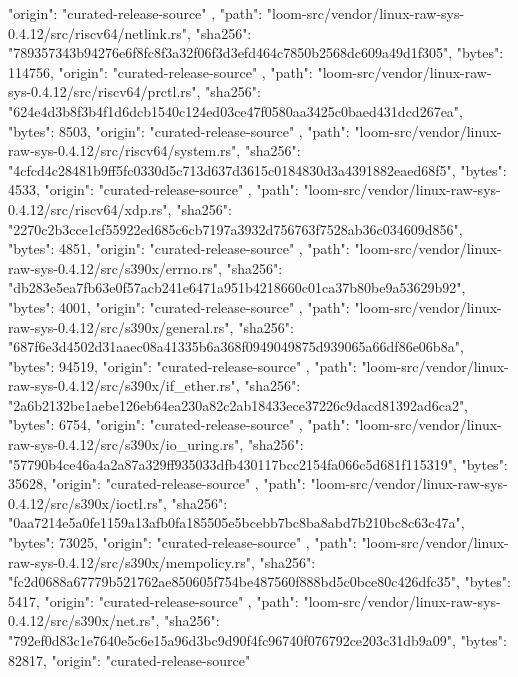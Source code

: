 {{      "origin": "curated-release-source"
    },
    {
      "path": "loom-src/vendor/linux-raw-sys-0.4.12/src/riscv64/netlink.rs",
      "sha256": "789357343b94276e6f8fc8f3a32f06f3d3efd464c7850b2568dc609a49d1f305",
      "bytes": 114756,
      "origin": "curated-release-source"
    },
    {
      "path": "loom-src/vendor/linux-raw-sys-0.4.12/src/riscv64/prctl.rs",
      "sha256": "624e4d3b8f3b4f1d6dcb1540c124ed03ce47f0580aa3425c0baed431dcd267ea",
      "bytes": 8503,
      "origin": "curated-release-source"
    },
    {
      "path": "loom-src/vendor/linux-raw-sys-0.4.12/src/riscv64/system.rs",
      "sha256": "4cfcd4c28481b9ff5fc0330d5c713d637d3615c0184830d3a4391882eaed68f5",
      "bytes": 4533,
      "origin": "curated-release-source"
    },
    {
      "path": "loom-src/vendor/linux-raw-sys-0.4.12/src/riscv64/xdp.rs",
      "sha256": "2270c2b3cce1cf55922ed685c6cb7197a3932d756763f7528ab36c034609d856",
      "bytes": 4851,
      "origin": "curated-release-source"
    },
    {
      "path": "loom-src/vendor/linux-raw-sys-0.4.12/src/s390x/errno.rs",
      "sha256": "db283e5ea7fb63e0f57acb241e6471a951b4218660c01ca37b80be9a53629b92",
      "bytes": 4001,
      "origin": "curated-release-source"
    },
    {
      "path": "loom-src/vendor/linux-raw-sys-0.4.12/src/s390x/general.rs",
      "sha256": "687f6e3d4502d31aaec08a41335b6a368f0949049875d939065a66df86e06b8a",
      "bytes": 94519,
      "origin": "curated-release-source"
    },
    {
      "path": "loom-src/vendor/linux-raw-sys-0.4.12/src/s390x/if_ether.rs",
      "sha256": "2a6b2132be1aebe126eb64ea230a82c2ab18433ece37226c9dacd81392ad6ca2",
      "bytes": 6754,
      "origin": "curated-release-source"
    },
    {
      "path": "loom-src/vendor/linux-raw-sys-0.4.12/src/s390x/io_uring.rs",
      "sha256": "57790b4ce46a4a2a87a329ff935033dfb430117bcc2154fa066c5d681f115319",
      "bytes": 35628,
      "origin": "curated-release-source"
    },
    {
      "path": "loom-src/vendor/linux-raw-sys-0.4.12/src/s390x/ioctl.rs",
      "sha256": "0aa7214e5a0fe1159a13afb0fa185505e5bcebb7bc8ba8abd7b210bc8c63c47a",
      "bytes": 73025,
      "origin": "curated-release-source"
    },
    {
      "path": "loom-src/vendor/linux-raw-sys-0.4.12/src/s390x/mempolicy.rs",
      "sha256": "fc2d0688a67779b521762ae850605f754be487560f888bd5c0bce80c426dfc35",
      "bytes": 5417,
      "origin": "curated-release-source"
    },
    {
      "path": "loom-src/vendor/linux-raw-sys-0.4.12/src/s390x/net.rs",
      "sha256": "792ef0d83c1e7640e5c6e15a96d3bc9d90f4fc96740f076792ce203c31db9a09",
      "bytes": 82817,
      "origin": "curated-release-source"
}}
